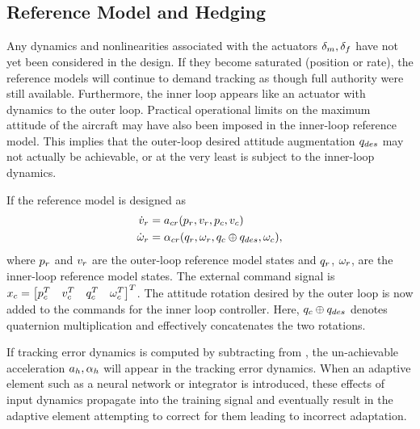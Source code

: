 \subsection{Reference Model and Hedging}
Any dynamics and nonlinearities associated with the actuators $\delta_m,
\delta_f$ have not yet been considered in the design. If they become
saturated (position or rate), the reference models will continue to
demand tracking as though full authority were still available.
Furthermore, the inner loop appears like an actuator with dynamics to
the outer loop. Practical operational limits on the maximum attitude
of the aircraft may have also been imposed in the inner-loop
reference model. This implies that the outer-loop desired attitude
augmentation $q_{des}$ may not actually be achievable, or at the very
least is subject to the inner-loop dynamics.

If the reference model is designed as
\begin{equation}
\begin{split}
\label{e:rmnopch}
\dot{v}_{r} &= a_{cr} (p_{r},v_{r},p_c,v_c) \\
\dot{\omega}_{r} &= \alpha_{cr}(q_{r},\omega_{r},q_c\oplus q_{des},\omega_c),
\end{split}
\end{equation}
where $p_{r}$ and $v_{r}$ are the outer-loop reference model states
and $q_{r}$, $\omega_{r}$, are the inner-loop reference model states.
The external command signal is $x_c =
\begin{bmatrix}p_c^T & v_c^T & q_c^T & \omega_c^T\end{bmatrix}^T$. The attitude rotation desired by the outer loop is now added to the
commands for the inner loop controller. Here, $q_c \oplus q_{des}$
denotes quaternion multiplication\cite{stevens2003} and effectively concatenates the two rotations.

If tracking error dynamics is computed by subtracting  from , the un-achievable acceleration $a_{h}, \alpha_{h}$ will appear in the tracking error dynamics. When an adaptive element such as a neural network or integrator is introduced, these effects of input dynamics propagate into the training signal and eventually result in the adaptive element attempting to correct for them leading to incorrect adaptation.


